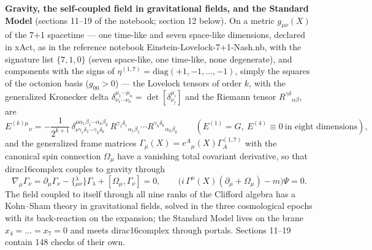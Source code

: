 \documentclass[10pt,a4paper]{article}
\begin{document}
\textbf{Gravity, the self-coupled field in gravitational fields, and the Standard Model} (sections 11–19 of the notebook; section 12 below). On a metric $g_{\mu\nu}(X)$ of the 7+1 spacetime — one time-like and seven space-like dimensions, declared in xAct, as in the reference notebook Einstein-Lovelock-7+1-Nash.nb, with the signature list $\{7,1,0\}$ (seven space-like, one time-like, none degenerate), and components with the signs of $\eta^{(1,7)}=\mathrm{diag}(+1,-1,\dots,-1)$, simply the squares of the octonion basis ($g_{00}>0$) — the Lovelock tensors of order $k$, with the generalized Kronecker delta $\delta^{\mu_1\cdots\mu_n}_{\nu_1\cdots\nu_n}=\det[\delta^{\mu_i}_{\nu_j}]$ and the Riemann tensor $R^{\gamma\delta}{}_{\alpha\beta}$, are
\begin{equation*}
E^{(k)\mu}{}_\nu=-\frac{1}{2^{k+1}}\,\delta^{\mu\alpha_1\beta_1\cdots\alpha_k\beta_k}_{\nu\gamma_1\delta_1\cdots\gamma_k\delta_k}\,R^{\gamma_1\delta_1}{}_{\alpha_1\beta_1}\cdots R^{\gamma_k\delta_k}{}_{\alpha_k\beta_k}\qquad(E^{(1)}=G,\ E^{(4)}\equiv0\ \text{in eight dimensions}),
\end{equation*}
and the generalized frame matrices $\Gamma_\mu(X)=e^A{}_\mu(X)\Gamma^{(1,7)}_A$ with the canonical spin connection $\Omega_\mu$ have a vanishing total covariant derivative, so that dirac16complex couples to gravity through
\begin{equation*}
\nabla_\mu\Gamma_\nu=\partial_\mu\Gamma_\nu-\{{}^{\lambda}_{\mu\nu}\}\Gamma_\lambda+[\Omega_\mu,\Gamma_\nu]=0,\qquad \big(i\,\Gamma^\mu(X)(\partial_\mu+\Omega_\mu)-m\big)\Psi=0 .
\end{equation*}
The field coupled to itself through all nine ranks of the Clifford algebra has a Kohn–Sham theory in gravitational fields, solved in the three cosmological epochs with its back-reaction on the expansion; the Standard Model lives on the brane $x_4=\dots=x_7=0$ and meets dirac16complex through portals. Sections 11–19 contain 148 checks of their own.
\end{document}
